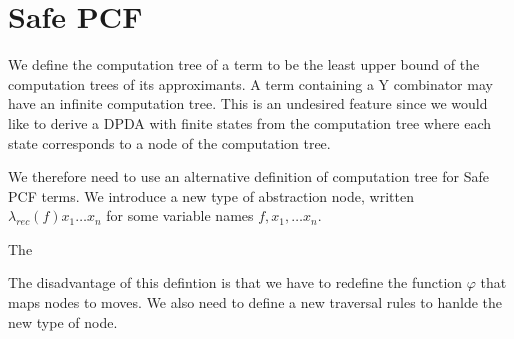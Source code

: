\documentclass{article}
\begin{document}
\section{Safe PCF}

We define the computation tree of a term to be the least upper bound of the computation trees of its approximants. A term containing a Y combinator may have an infinite computation tree. This is an undesired feature since we would like to derive a DPDA with finite states from the computation tree where each state corresponds to a node of the computation tree.

We therefore need to use an alternative definition of computation tree for Safe PCF terms.  We introduce a new type of abstraction node, written $\lambda_{rec}(f) x_1 \ldots x_n$ for some variable names $f, x_1, \ldots x_n$.

The 


The disadvantage of this defintion is that we have to redefine the function $\varphi$ that maps nodes to moves. We also need to define a new traversal rules to hanlde the new type of node.
\end{document}
